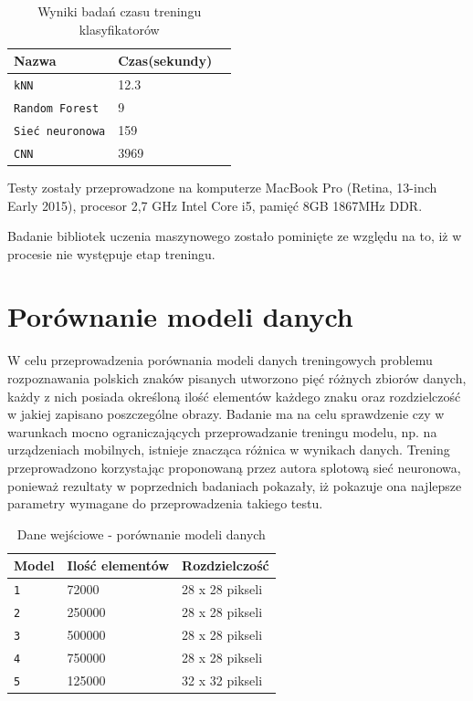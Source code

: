 \documentclass[brudnopis]{xmgr}
\begin{document}
\begin{table}[!htb]
\begin{tabular}{|l|l|l|} \hline
Nazwa & Czas(sekundy) \\ \hline
\texttt{kNN} & 12.3 \\ \hline
\texttt{Random Forest} & 9 \\ \hline
\texttt{Sieć neuronowa} & 159 \\ \hline
\texttt{CNN}     & 3969 \\ \hline
\end{tabular}
\caption{Wyniki badań czasu treningu klasyfikatorów}
\end{table}

Testy zostały przeprowadzone na komputerze MacBook Pro
(Retina, 13-inch Early 2015), procesor 2,7 GHz Intel Core i5, pamięć 8GB 1867MHz DDR.

Badanie bibliotek uczenia maszynowego zostało pominięte ze względu na to, iż w procesie nie występuje etap treningu.

\section{Porównanie modeli danych}

W celu przeprowadzenia porównania modeli danych treningowych problemu rozpoznawania polskich znaków pisanych utworzono pięć różnych zbiorów danych, każdy z nich posiada określoną ilość elementów każdego znaku oraz rozdzielczość w jakiej zapisano poszczególne obrazy. Badanie ma na celu sprawdzenie czy w warunkach mocno ograniczających przeprowadzanie treningu modelu, np. na urządzeniach mobilnych, istnieje znacząca różnica w wynikach danych. Trening przeprowadzono korzystając proponowaną przez autora splotową sieć neuronowa, ponieważ rezultaty w poprzednich badaniach pokazały, iż pokazuje ona najlepsze parametry wymagane do przeprowadzenia takiego testu.

\begin{table}[!htb]
\begin{tabular}{|l|l|l|} \hline
Model & Ilość elementów & Rozdzielczość  \\ \hline
\texttt 1 & 72000 & 28 x 28 pikseli \\ \hline
\texttt 2 & 250000 & 28 x 28 pikseli \\ \hline
\texttt 3 & 500000 & 28 x 28 pikseli \\ \hline
\texttt 4 & 750000 & 28 x 28 pikseli \\ \hline
\texttt 5 & 125000 & 32 x 32 pikseli \\ \hline
\end{tabular}
\caption{Dane wejściowe - porównanie modeli danych}
\end{table}
\end{document}

